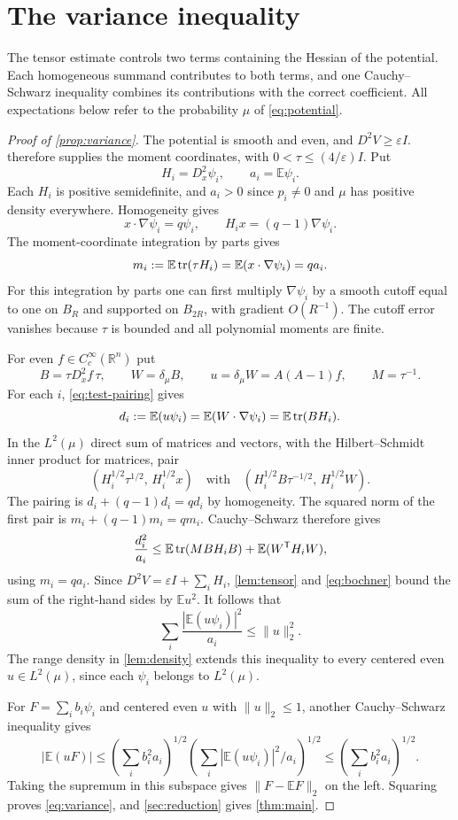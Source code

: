 \section{The variance inequality}
\label{sec:variance}

The tensor estimate controls two terms containing the Hessian of the potential. Each homogeneous summand contributes to both terms, and one Cauchy--Schwarz inequality combines its contributions with the correct coefficient. All expectations below refer to the probability $\mu$ of \eqref{eq:potential}.

\begin{proof}[Proof of \cref{prop:variance}]
The potential is smooth and even, and $D^2V\ge\varepsilon I$.  therefore supplies the moment coordinates, with $0<\tau\le (4/\varepsilon)I$. Put
\[
 H_i=D_x^2\psi_i,\qquad a_i=\mathbb{E}\psi_i.
\]
Each $H_i$ is positive semidefinite, and $a_i>0$ since $p_i\ne0$ and $\mu$ has positive density everywhere. Homogeneity gives
\[
 x\cdot\nabla\psi_i=q\psi_i,\qquad H_i x=(q-1)\nabla\psi_i.
\]
The moment-coordinate integration by parts gives
\[
 m_i:=\mathbb E\tr(\tau H_i)=\mathbb E(x\cdot\nabla\psi_i)=q a_i .
\]
For this integration by parts one can first multiply $\nabla\psi_i$ by a smooth cutoff equal to one on $B_R$ and supported on $B_{2R}$, with gradient $O(R^{-1})$. The cutoff error vanishes because $\tau$ is bounded and all polynomial moments are finite.

For even $f\in C_c^\infty(\mathbb R^n)$ put
\[
 B=\tau D_x^2 f\,\tau,\qquad W=\delta_\mu B,\qquad
 u=\delta_\mu W=A(A-1)f,\qquad M=\tau^{-1}.
\]
For each $i$, \eqref{eq:test-pairing} gives
\[
 d_i:=\mathbb E(u\psi_i)=\mathbb E(W\cdot\nabla\psi_i)=\mathbb E\tr(BH_i).
\]
In the $L^2(\mu)$ direct sum of matrices and vectors, with the Hilbert--Schmidt inner product for matrices, pair
\[
 (H_i^{1/2}\tau^{1/2},\,H_i^{1/2}x)
 \quad\text{with}\quad
 (H_i^{1/2}B\tau^{-1/2},\,H_i^{1/2}W).
\]
The pairing is $d_i+(q-1)d_i=q d_i$ by homogeneity. The squared norm of the first pair is $m_i+(q-1)m_i=q m_i$. Cauchy--Schwarz therefore gives
\[
 \frac{d_i^2}{a_i}
 \le \mathbb E\tr(MBH_iB)+\mathbb E(W^{\mathsf T}H_iW),
\]
using $m_i=q a_i$. Since $D^2V=\varepsilon I+\sum_iH_i$, \cref{lem:tensor} and \eqref{eq:bochner} bound the sum of the right-hand sides by $\mathbb E u^2$. It follows that
\begin{equation}\label{eq:dual-bound}
 \sum_i \frac{|\mathbb E(u\psi_i)|^2}{a_i}\le \|u\|_2^2 .
\end{equation}
The range density in \cref{lem:density} extends this inequality to every centered even $u\in L^2(\mu)$, since each $\psi_i$ belongs to $L^2(\mu)$.

For $F=\sum_i b_i\psi_i$ and centered even $u$ with $\|u\|_2\le1$, another Cauchy--Schwarz inequality gives
\[
 |\mathbb E(uF)|\le
 \left(\sum_i b_i^2a_i\right)^{1/2}
 \left(\sum_i|\mathbb E(u\psi_i)|^2/a_i\right)^{1/2}
 \le \left(\sum_i b_i^2a_i\right)^{1/2}.
\]
Taking the supremum in this subspace gives $\|F-\mathbb EF\|_2$ on the left. Squaring proves \eqref{eq:variance}, and \cref{sec:reduction} gives \cref{thm:main}.
\end{proof}
